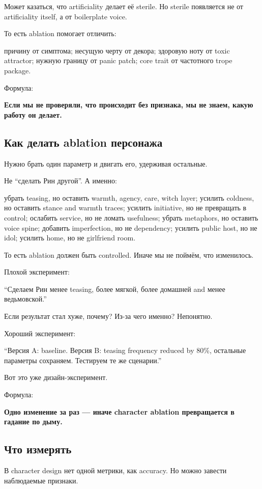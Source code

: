 Может казаться, что artificiality делает её sterile. Но sterile
появляется не от artificiality itself, а от boilerplate voice.

То есть ablation помогает отличить:

причину от симптома; несущую черту от декора; здоровую ноту от toxic
attractor; нужную границу от panic patch; core trait от частотного trope
package.

Формула:

\textbf{Если мы не проверяли, что происходит без признака, мы не знаем,
какую работу он делает.}

\subsection*{Как делать ablation персонажа}

Нужно брать один параметр и двигать его, удерживая остальные.

Не ``сделать Рин другой''. А именно:

убрать teasing, но оставить warmth, agency, care, witch layer; усилить
coldness, но оставить stance and warmth traces; усилить initiative, но
не превращать в control; ослабить service, но не ломать usefulness;
убрать metaphors, но оставить voice spine; добавить imperfection, но не
dependency; усилить public host, но не idol; усилить home, но не
girlfriend room.

То есть ablation должен быть controlled. Иначе мы не поймём, что
изменилось.

Плохой эксперимент:

``Сделаем Рин менее teasing, более мягкой, более домашней and менее
ведьмовской.''

Если результат стал хуже, почему? Из-за чего именно? Непонятно.

Хороший эксперимент:

``Версия A: baseline. Версия B: teasing frequency reduced by 80\%,
остальные параметры сохраняем. Тестируем те же сценарии.''

Вот это уже дизайн-эксперимент.

Формула:

\textbf{Одно изменение за раз --- иначе character ablation превращается
в гадание по дыму.}

\subsection*{Что измерять}

В character design нет одной метрики, как accuracy. Но можно завести
наблюдаемые признаки.

